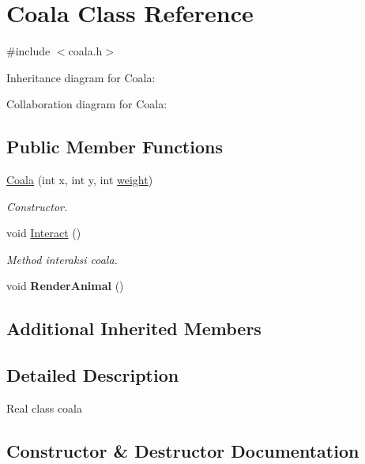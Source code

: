 \hypertarget{classCoala}{}\section{Coala Class Reference}
\label{classCoala}


{\ttfamily \#include $<$coala.\+h$>$}



Inheritance diagram for Coala\+:


Collaboration diagram for Coala\+:
\subsection*{Public Member Functions}
\begin{DoxyCompactItemize}
\item 
\hyperlink{classCoala_ae9ad5eb4dc897fe15c78ff8f9f0af1b7}{Coala} (int x, int y, int \hyperlink{classAnimal_a9a3b22f243f7109c57f36b3c660feb6e}{weight})
\begin{DoxyCompactList}\small\item\em Constructor. \end{DoxyCompactList}\item 
void \hyperlink{classCoala_a945379b4cc21870068e43f6c465dc849}{Interact} ()\hypertarget{classCoala_a945379b4cc21870068e43f6c465dc849}{}\label{classCoala_a945379b4cc21870068e43f6c465dc849}

\begin{DoxyCompactList}\small\item\em Method interaksi coala. \end{DoxyCompactList}\item 
void {\bfseries Render\+Animal} ()\hypertarget{classCoala_aa69f3ae7291af318159de6559f72c68d}{}\label{classCoala_aa69f3ae7291af318159de6559f72c68d}

\end{DoxyCompactItemize}
\subsection*{Additional Inherited Members}


\subsection{Detailed Description}
Real class coala 

\subsection{Constructor \& Destructor Documentation}
